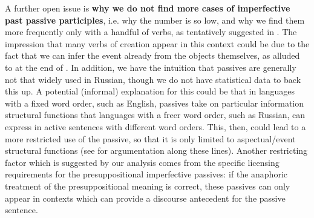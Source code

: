 \documentclass[output=paper,
modfonts,
newtxmath,
hidelinks
]{langscibook}
\begin{document}
A further open issue is \textbf{why we do not find more cases of imperfective past passive participles}, i.e. why the number is so low, and why we find them more frequently only with a handful of verbs, as tentatively suggested in . The impression that many verbs of creation appear in this context could be due to the fact that we can infer the event already from the objects themselves, as alluded to at the end of . In addition, we have the intuition that passives are generally not that widely used in Russian, though we do not have statistical data to back this up. A potential (informal) explanation for this could be that in languages with a fixed word order, such as English, passives take on particular information structural functions that languages with a freer word order, such as Russian, can express in active sentences with different word orders. This, then, could lead to a more restricted use of the passive, so that it is only limited to aspectual/event structural functions (see \citealt{abraham06} for argumentation along these lines). Another restricting factor which is suggested by our analysis comes from the specific licensing requirements for the presuppositional imperfective passives: if the anaphoric treatment of the presuppositional meaning is correct, these passives can only appear in contexts which can provide a discourse antecedent for the passive sentence.
\end{document}
